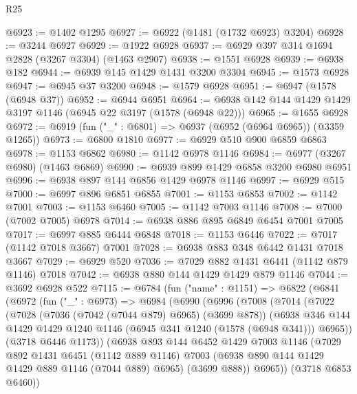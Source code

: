 \begin{lexlean}{R25}
\begin{coremodule}
@6923 := @1402 @1295
@6927 := @6922 (@1481 (@1732 @6923) @3204)
@6928 := @3244 @6927
@6929 := @1922 @6928
@6937 := @6929 @397 @314 @1694 @2828 (@3267 @3304) (@1463 @2907)
@6938 := @1551 @6928
@6939 := @6938 @182
@6944 := @6939 @145 @1429 @1431 @3200 @3304
@6945 := @1573 @6928
@6947 := @6945 @37 @3200
@6948 := @1579 @6928
@6951 := @6947 (@1578 (@6948 @37))
@6952 := @6944 @6951
@6964 := @6938 @142 @144 @1429 @1429 @3197 @1146 (@6945 @22 @3197 (@1578 (@6948 @22)))
@6965 := @1655 @6928
@6972 := @6919 (fun ("_" : @6801) => @6937 (@6952 (@6964 @6965)) (@3359 @1265))
@6973 := @6800 @1810
@6977 := @6929 @510 @900 @6859 @6863
@6978 := @1153 @6862
@6980 := @1142 @6978 @1146
@6984 := @6977 (@3267 @6980) (@1463 @6869)
@6990 := @6939 @899 @1429 @6858 @3200 @6980 @6951
@6996 := @6938 @897 @144 @6856 @1429 @6978 @1146
@6997 := @6929 @515
@7000 := @6997 @896 @6851 @6855
@7001 := @1153 @6853
@7002 := @1142 @7001
@7003 := @1153 @6460
@7005 := @1142 @7003 @1146
@7008 := @7000 (@7002 @7005) @6978
@7014 := @6938 @886 @895 @6849 @6454 @7001 @7005
@7017 := @6997 @885 @6444 @6848
@7018 := @1153 @6446
@7022 := @7017 (@1142 @7018 @3667) @7001
@7028 := @6938 @883 @348 @6442 @1431 @7018 @3667
@7029 := @6929 @520
@7036 := @7029 @882 @1431 @6441 (@1142 @879 @1146) @7018
@7042 := @6938 @880 @144 @1429 @1429 @879 @1146
@7044 := @3692 @6928 @522
@7115 := @6784
    (fun ("name" : @1151) =>
    @6822
      (@6841
        (@6972
          (fun ("_" : @6973) =>
          @6984
            (@6990
              (@6996
                (@7008
                  (@7014
                    (@7022
                      (@7028
                        (@7036 (@7042 (@7044 @879) @6965) (@3699 @878))
                        (@6938
                          @346
                          @144
                          @1429
                          @1429
                          @1240
                          @1146
                          (@6945 @341 @1240 (@1578 (@6948 @341)))
                          @6965))
                      (@3718 @6446 @1173))
                    (@6938
                      @893
                      @144
                      @6452
                      @1429
                      @7003
                      @1146
                      (@7029
                        @892
                        @1431
                        @6451
                        (@1142 @889 @1146)
                        @7003
                        (@6938 @890 @144 @1429 @1429 @889 @1146 (@7044 @889) @6965)
                        (@3699 @888))
                      @6965))
                  (@3718 @6853 @6460))

\end{coremodule}
\end{lexlean}
